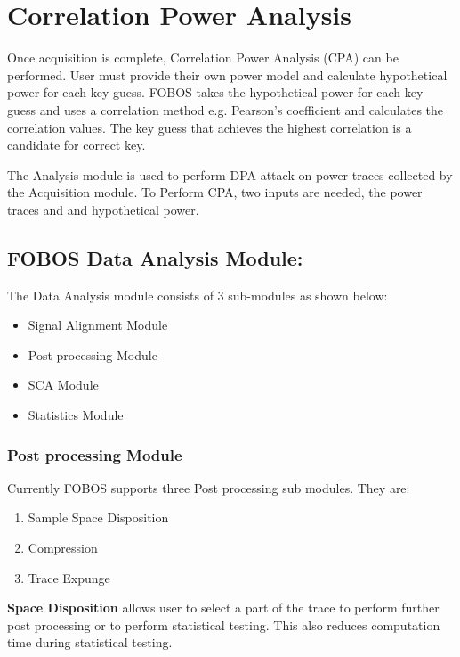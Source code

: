 \chapter{Correlation Power Analysis} \label{chap:fobos-cpa}

Once acquisition is complete, Correlation Power Analysis (CPA) can be performed.
User must provide their own power model and calculate hypothetical power for each key guess.
FOBOS takes the hypothetical power for each key guess and uses a correlation method e.g. Pearson's coefficient and calculates the correlation values.
The key guess that achieves the highest correlation is a candidate for correct key.

The Analysis module is used to perform DPA attack on power traces collected by the Acquisition
module. To Perform CPA, two inputs are needed, the power traces and and hypothetical power.


\section{FOBOS Data Analysis Module:}
The Data Analysis module consists of 3 sub-modules as shown below:
\begin{itemize}
\item Signal Alignment Module
\item Post processing Module
\item SCA Module
\item Statistics Module
\end{itemize}

\subsection{Post processing Module}
Currently FOBOS supports three Post processing sub modules. They are:
\begin{enumerate}
\item Sample Space Disposition
\item Compression
\item Trace Expunge
\end{enumerate}

\textbf{Space Disposition} allows user to select a part of the trace to perform further post processing
or to perform statistical testing. This also reduces computation time during statistical testing.

